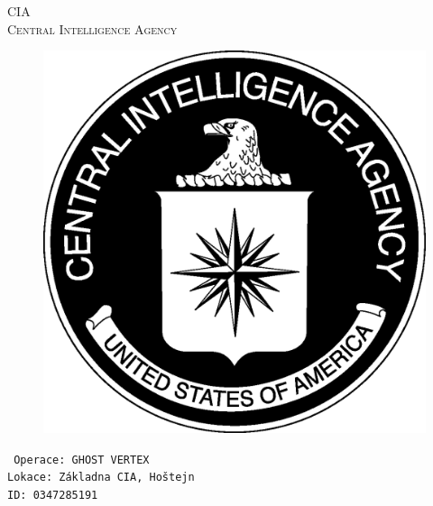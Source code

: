 \documentclass[a4paper, \fontheight]{article}
\begin{document}
	\begin{titlepage}
		\begin{center}		
			\textsc{{\fontsize{80}{0}\selectfont CIA}\\[2em]
				\Huge Central Intelligence Agency\\[2.5em]}
				
			\begin{figure}[H]
				\centering
				\includegraphics[scale=0.6]{sources/CIA_logo.eps}
			\end{figure}
		\end{center}	
		\vfill
		\noindent
		\texttt{\LARGE
				Operace: GHOST VERTEX\\[0.4em]
				Lokace: Základna CIA, Hoštejn\\[0.4em]
				ID: 0347285191}	
\end{titlepage} 
\end{document}
